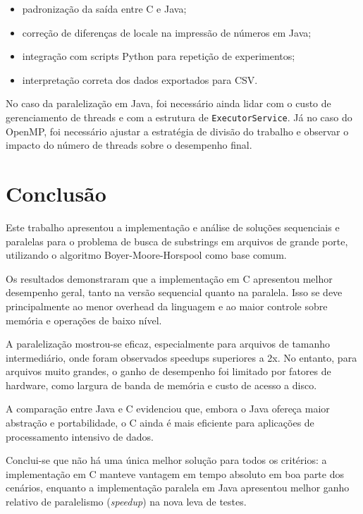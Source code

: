 \documentclass[10pt,twocolumn,a4paper]{article}
\begin{document}
\begin{itemize}[leftmargin=*]
    \item padronização da saída entre C e Java;
    \item correção de diferenças de locale na impressão de números em Java;
    \item integração com scripts Python para repetição de experimentos;
    \item interpretação correta dos dados exportados para CSV.
\end{itemize}

No caso da paralelização em Java, foi necessário ainda lidar com o custo de gerenciamento de threads e com a estrutura de \texttt{ExecutorService}. Já no caso do OpenMP, foi necessário ajustar a estratégia de divisão do trabalho e observar o impacto do número de threads sobre o desempenho final.

\section{Conclusão}

Este trabalho apresentou a implementação e análise de soluções sequenciais e paralelas para o problema de busca de substrings em arquivos de grande porte, utilizando o algoritmo Boyer-Moore-Horspool como base comum.

Os resultados demonstraram que a implementação em C apresentou melhor desempenho geral, tanto na versão sequencial quanto na paralela. Isso se deve principalmente ao menor overhead da linguagem e ao maior controle sobre memória e operações de baixo nível.

A paralelização mostrou-se eficaz, especialmente para arquivos de tamanho intermediário, onde foram observados speedups superiores a 2x. No entanto, para arquivos muito grandes, o ganho de desempenho foi limitado por fatores de hardware, como largura de banda de memória e custo de acesso a disco.

A comparação entre Java e C evidenciou que, embora o Java ofereça maior abstração e portabilidade, o C ainda é mais eficiente para aplicações de processamento intensivo de dados.

Conclui-se que não há uma única melhor solução para todos os critérios: a implementação em C manteve vantagem em tempo absoluto em boa parte dos cenários, enquanto a implementação paralela em Java apresentou melhor ganho relativo de paralelismo (\textit{speedup}) na nova leva de testes.
\end{document}
